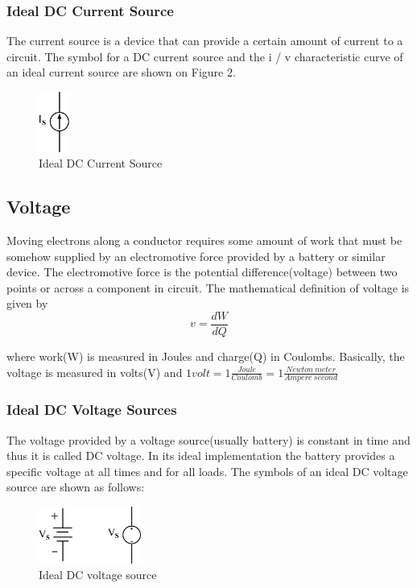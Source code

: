\documentclass[a4 paper]{article}
\numberwithin{equation}{section}
\newcommand{\0}{\mathbf{0}}
\begin{document}
\subsubsection{Ideal DC Current Source}
The current source is a device that can provide a certain amount of current to a circuit. The symbol for a DC current source and the i / v characteristic curve of an ideal current source are shown on Figure 2.
\begin{figure}[!ht]
  \caption{Ideal DC Current Source}
  \centering
  \includegraphics[width=0.09\textwidth]{./images/circuit1/current1}
\end{figure}




\subsection{Voltage}
Moving electrons along a conductor requires some amount of work that must be somehow supplied by an electromotive force provided by a battery or similar device. The electromotive force is the potential difference(voltage) between two points or across a component in circuit. The mathematical definition of voltage is given by
\begin{equation}
v = \frac{dW}{dQ} 
\end{equation}

where work(W) is measured in Joules and charge(Q) in Coulombs.
Basically, the voltage is measured in volts(V) and $1 volt = 1 \frac{Joule}{Coulomb} = 1 \frac{Newton \ meter}{Ampere \ second}$

\subsubsection{Ideal DC Voltage Sources}
The voltage provided by a voltage source(usually battery) is constant in time and thus it is called DC voltage. In its ideal implementation the battery provides a specific voltage at all times and for all loads.
The symbols of an ideal DC voltage source are shown as follows:

\begin{figure}[!ht]
  \caption{Ideal DC voltage source}
  \centering
  \includegraphics[width=0.3\textwidth]{./images/circuit1/VoltageSource}
\end{figure}
\end{document}
